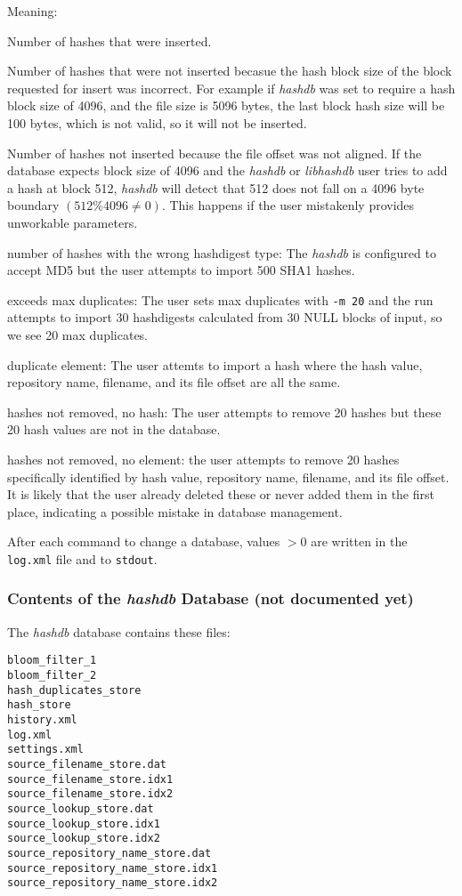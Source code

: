 \documentclass[12pt,twoside]{article}
\newcommand{\hdb}{\emph{hashdb}\xspace}
\newcommand{\libhdb}{\emph{libhashdb}\xspace}
\begin{document}
Meaning:
\begin{compactitem}
\item Number of hashes that were inserted.
\item Number of hashes that were not inserted
becasue the hash block size of the block requested for insert was
incorrect.
For example if \hdb was set to require a hash block size of 4096,
and the file size is 5096 bytes,
the last block hash size will be 100 bytes, which is not valid,
so it will not be inserted.
\item Number of hashes not inserted because the file offset was not aligned.
If the database expects block size of 4096 and the \hdb or \libhdb user
tries to add a hash at block 512, \hdb will detect that 512 does not fall on
a 4096 byte boundary $(512 \% 4096 \ne 0)$.
This happens if the user mistakenly provides unworkable parameters.
\item number of hashes with the wrong hashdigest type:
The \hdb is configured to accept MD5
but the user attempts to import 500 SHA1 hashes.
\item exceeds max duplicates: The user sets max duplicates with \texttt{-m 20}
and the run attempts to import 30 hashdigests calculated from 30 NULL blocks
of input, so we see 20 max duplicates.
\item duplicate element: The user attemts to import a hash
where the hash value, repository name, filename, and its file offset
are all the same.
\item hashes not removed, no hash: The user attempts to remove 20
hashes but these 20 hash values are not in the database.
\item hashes not removed, no element: the user attempts to remove 20 hashes
specifically identified by 
hash value, repository name, filename, and its file offset.
It is likely that the user already deleted these or never added them
in the first place, indicating a possible mistake in database management.
\end{compactitem}

After each command to change a database, values $> 0$ are written
in the \texttt{log.xml} file and to \texttt{stdout}.

\subsubsection*{Contents of the \hdb Database (not documented yet)}
The \hdb database contains these files:

\begin{verbatim}
bloom_filter_1
bloom_filter_2
hash_duplicates_store
hash_store
history.xml
log.xml
settings.xml
source_filename_store.dat
source_filename_store.idx1
source_filename_store.idx2
source_lookup_store.dat
source_lookup_store.idx1
source_lookup_store.idx2
source_repository_name_store.dat
source_repository_name_store.idx1
source_repository_name_store.idx2
\end{verbatim}
\end{document}
